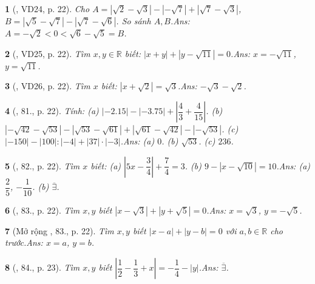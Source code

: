 \documentclass{article}
\newtheorem{baitoan}{}
\begin{document}
\begin{baitoan}[\cite{Tuyen_Toan_7}, VD24, p. 22]
	Cho $A = |\sqrt{2} - \sqrt{3}| - |-\sqrt{7}| + |\sqrt{7} - \sqrt{3}|$, $B = |\sqrt{5} - \sqrt{7}| - |\sqrt{7} - \sqrt{6}|$. So sánh $A,B$.\hfill{\sf Ans:} $A = -\sqrt{2} < 0 < \sqrt{6} - \sqrt{5} = B$.
\end{baitoan}	

\begin{baitoan}[\cite{Tuyen_Toan_7}, VD25, p. 22]
	Tìm $x,y\in\mathbb{R}$ biết: $|x + y| + |y - \sqrt{11}| = 0$.\hfill{\sf Ans:} $x = -\sqrt{11}$, $y = \sqrt{11}$.
\end{baitoan}

\begin{baitoan}[\cite{Tuyen_Toan_7}, VD26, p. 22]
	Tìm $x$ biết: $|x + \sqrt{2}| = \sqrt{3}$.\hfill{\sf Ans:} $-\sqrt{3} - \sqrt{2}$.
\end{baitoan}

\begin{baitoan}[\cite{Tuyen_Toan_7}, 81., p. 22]
	Tính: (a) $|-2.15| - |-3.75| + \left|\dfrac{4}{3} + \dfrac{4}{15}\right|$. (b) $|-\sqrt{42} - \sqrt{53}| - |\sqrt{53} - \sqrt{61}| + |\sqrt{61} - \sqrt{42}| - |-\sqrt{53}|$. (c) $|-150| - |100|:|-4| + |37|\cdot|-3|$.\hfill{\sf Ans:} (a) $0$. (b) $\sqrt{53}$. (c) $236$.
\end{baitoan}

\begin{baitoan}[\cite{Tuyen_Toan_7}, 82., p. 22]
	Tìm $x$ biết: (a) $\left|5x - \dfrac{3}{4}\right| + \dfrac{7}{4} = 3$. (b) $9 - |x - \sqrt{10}| = 10$.\hfill{\sf Ans:} (a) $\dfrac{2}{5}$, $-\dfrac{1}{10}$. (b) $\overline{\exists}$.
\end{baitoan}

\begin{baitoan}[\cite{Tuyen_Toan_7}, 83., p. 22]
	Tìm $x,y$ biết $|x - \sqrt{3}| + |y + \sqrt{5}| = 0$.\hfill{\sf Ans:} $x = \sqrt{3}$, $y = -\sqrt{5}$.
\end{baitoan}

\begin{baitoan}[Mở rộng \cite{Tuyen_Toan_7}, 83., p. 22]
	Tìm $x,y$ biết $|x - a| + |y - b| = 0$ với $a,b\in\mathbb{R}$ cho trước.\hfill{\sf Ans:} $x = a$, $y = b$.
\end{baitoan}

\begin{baitoan}[\cite{Tuyen_Toan_7}, 84., p. 23]
	Tìm $x,y$ biết $\left|\dfrac{1}{2} - \dfrac{1}{3} + x\right| = -\dfrac{1}{4} - |y|$.\hfill{\sf Ans:} $\overline{\exists}$.
\end{baitoan}
\end{document}

